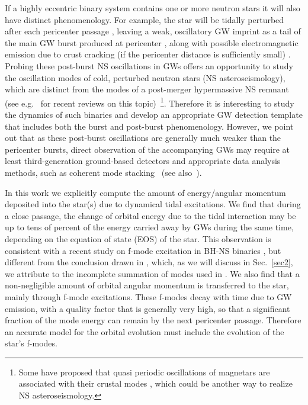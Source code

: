 \documentclass[prd,aps,floatfix,superscriptaddress,nofootinbib,twocolumn,10pt,English]{revtex4}
\begin{document}
If a highly eccentric binary system contains
one or more neutron stars it will also have distinct phenomenology.
For example, the star will be tidally perturbed after each pericenter
passage \cite{1977ApJ...216..914T}, leaving a weak, oscillatory GW
imprint as a tail of the main GW burst produced at pericenter
\cite{gold2012eccentric,East:2011xa,East:2012ww}, along with possible
electromagnetic emission due to crust
cracking (if the pericenter distance is sufficiently small) \cite{East:2012ww,Tsang:2013mca}.  
Probing these post-burst NS oscillations in GWs offers an opportunity
to study the oscillation modes of cold, perturbed neutron stars (NS
asteroseismology), which are distinct from the modes of a post-merger
hypermassive NS remnant (see
e.g.~\cite{Paschalidis:2016vmz,Baiotti:2016qnr} for recent reviews on
this topic)~\footnote{Some have proposed that quasi periodic
  oscillations of magnetars are associated with their crustal modes
  \cite{barat1983fine,duncan1998global,0004-637X-841-1-54}, which
  could be another way to realize NS asteroseismology.}.  Therefore it
is interesting to study the dynamics of such binaries and develop an
appropriate GW detection template that includes both the burst and
post-burst phenomenology. However, we point out that as these
post-burst oscillations are generally much weaker than the pericenter
bursts, direct observation of the accompanying GWs may require at
least third-generation ground-based detectors and appropriate data
analysis methods, such as coherent mode
stacking~\cite{yang2017black,PhysRevD.97.024049,berti2018extreme} (see
also~\cite{Bose:2017jvkxs,Brito:2018rfr}).



In this work we explicitly compute the amount of energy/angular
momentum deposited into the star(s) due to dynamical tidal
excitations. We find that during a close passage, the change of
orbital energy due to the tidal interaction may be up
to tens of percent of the energy carried away by GWs during the same time,
depending on the equation of state (EOS) of the
star. This observation is consistent with a recent study on f-mode
excitation in BH-NS binaries \cite{parisi2018gravitational}, but
different from the conclusion drawn in
\cite{chirenti2016gravitational}, which, as we will discuss in Sec.~\ref{sec2}, 
we attribute to the incomplete
summation of modes used in \cite{chirenti2016gravitational}.
We also find that a non-negligible amount
of orbital angular momentum is transferred to the star, mainly through
f-mode excitations. These f-modes decay with time due to GW emission,
with a quality factor that is generally very high, so that a
significant fraction of the mode energy can remain by the next
pericenter passage. Therefore an accurate model for the orbital
evolution must include the evolution of the star's f-modes.
\end{document}

